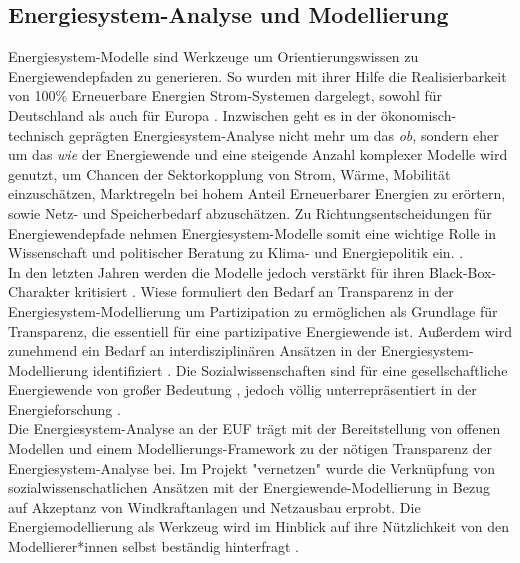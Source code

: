 \documentclass[a4paper,11pt,twoside]{scrartcl}
\begin{document}
\subsection*{Energiesystem-Analyse und Modellierung}
Energiesystem-Modelle sind Werkzeuge um Orientierungswissen zu Energiewendepfaden zu generieren. So wurden mit ihrer Hilfe die Realisierbarkeit von 100\% Erneuerbare Energien Strom-Systemen dargelegt, sowohl für Deutschland \cite{SRU2011} als auch für Europa \cite{Hohmeyer2015}. Inzwischen geht es in der ökonomisch-technisch geprägten Energiesystem-Analyse nicht mehr um das \textit{ob}, sondern eher um das \textit{wie} der Energiewende und  eine steigende Anzahl komplexer Modelle wird genutzt, um Chancen der Sektorkopplung von Strom, Wärme, Mobilität \cite{Quaschning2016} einzuschätzen, Marktregeln bei hohem Anteil Erneuerbarer Energien zu erörtern, sowie Netz- \cite{openEgo2015} und Speicherbedarf \cite{ANGUS2017} abzuschätzen.
Zu Richtungsentscheidungen für Energiewendepfade nehmen Energiesystem-Modelle somit eine wichtige Rolle in Wissenschaft und politischer Beratung zu Klima- und Energiepolitik ein. \cite{Dieckhoff2015}.\\
In den letzten Jahren werden die Modelle jedoch verstärkt für ihren Black-Box-Charakter kritisiert \cite{Pfenninger2017, Pfenninger2017b,Cao2016}. Wiese \cite{Wiese2015} formuliert den Bedarf an Transparenz in der Energiesystem-Modellierung um Partizipation zu ermöglichen \cite{Wiese2014} als Grundlage für Transparenz, die essentiell für eine partizipative Energiewende ist.
Außerdem wird zunehmend ein Bedarf an interdisziplinären Ansätzen in der Energiesystem-Modellierung identifiziert \cite{Wiese2018,Pfenninger2014,Schuitema2017}. Die  Sozialwissenschaften sind für eine gesellschaftliche Energiewende von großer Bedeutung \cite{Sovacool2015}, jedoch völlig unterrepräsentiert in der Energieforschung \cite{Sovacool2014}.\\
Die Energiesystem-Analyse an der EUF trägt mit der Bereitstellung von offenen Modellen \cite{renpass,renpassGIS} und einem Modellierungs-Framework \cite{oemof} zu der nötigen Transparenz der Energiesystem-Analyse bei. Im Projekt "vernetzen" \cite{vernetzen2016} wurde die Verknüpfung von sozialwissenschatlichen Ansätzen mit der Energiewende-Modellierung in Bezug auf Akzeptanz von Windkraftanlagen und Netzausbau erprobt. Die Energiemodellierung als Werkzeug wird im Hinblick auf ihre Nützlichkeit von den Modellierer*innen selbst beständig hinterfragt \cite{Wiese2018}.
\end{document}
